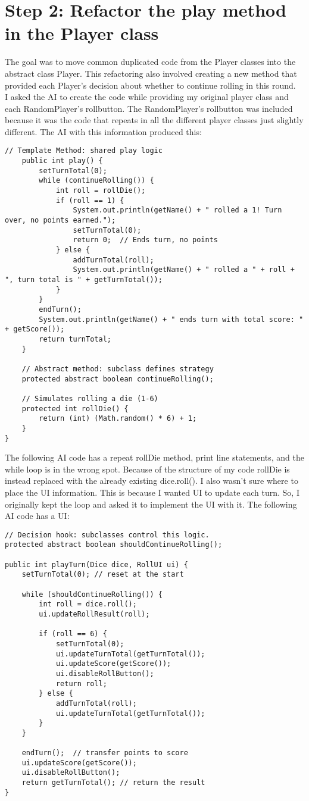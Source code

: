 \documentclass[a4paper,11pt]{article}
\begin{document}
\section*{Step 2: Refactor the play method in the Player class}
The goal was to move common duplicated code from the Player classes into the abstract class Player. This refactoring also involved creating a new method that provided each Player's decision about whether to continue rolling in this round. \\
I asked the AI to create the code while providing my original player class and each RandomPlayer's rollbutton. The RandomPlayer's rollbutton was included because it was the code that repeats in all the different player classes just slightly different. The AI with this information produced this:
\begin{lstlisting}
// Template Method: shared play logic
    public int play() {
        setTurnTotal(0);
        while (continueRolling()) {
            int roll = rollDie();
            if (roll == 1) {
                System.out.println(getName() + " rolled a 1! Turn over, no points earned.");
                setTurnTotal(0);
                return 0;  // Ends turn, no points
            } else {
                addTurnTotal(roll);
                System.out.println(getName() + " rolled a " + roll + ", turn total is " + getTurnTotal());
            }
        }
        endTurn();
        System.out.println(getName() + " ends turn with total score: " + getScore());
        return turnTotal;
    }

    // Abstract method: subclass defines strategy
    protected abstract boolean continueRolling();

    // Simulates rolling a die (1-6)
    protected int rollDie() {
        return (int) (Math.random() * 6) + 1;
    }
}
\end{lstlisting}
The following AI code has a repeat rollDie method, print line statements, and the while loop is in the wrong spot. Because of the structure of my code rollDie is instead replaced with the already existing dice.roll(). I also wasn't sure where to place the UI information. This is because I wanted UI to update each turn. So, I originally kept the loop and asked it to implement the UI with it. The following AI code has a UI:
\begin{lstlisting}
// Decision hook: subclasses control this logic.
protected abstract boolean shouldContinueRolling();

public int playTurn(Dice dice, RollUI ui) {
    setTurnTotal(0); // reset at the start

    while (shouldContinueRolling()) {
        int roll = dice.roll();
        ui.updateRollResult(roll);

        if (roll == 6) {
            setTurnTotal(0);
            ui.updateTurnTotal(getTurnTotal());
            ui.updateScore(getScore());
            ui.disableRollButton();
            return roll;
        } else {
            addTurnTotal(roll);
            ui.updateTurnTotal(getTurnTotal());
        }
    }

    endTurn();  // transfer points to score
    ui.updateScore(getScore());
    ui.disableRollButton();
    return getTurnTotal(); // return the result
}
\end{lstlisting}
\end{document}
